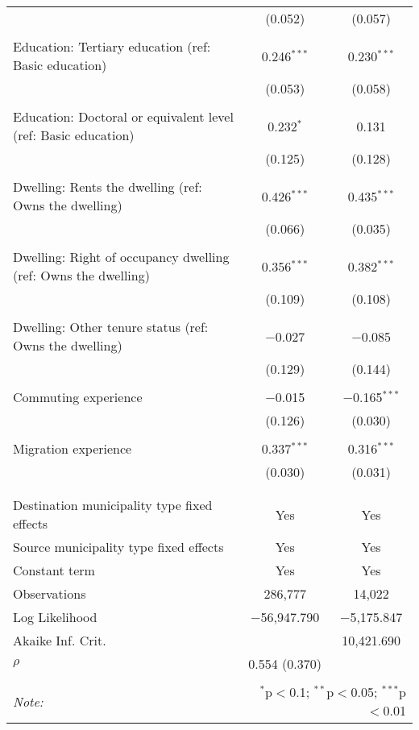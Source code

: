 \begin{table}[!htbp]
\begin{tabular}{@{\extracolsep{5pt}}lcc}
  & (0.052) & (0.057) \\ 
  & & \\ 
 Education: Tertiary education (ref: Basic education) & 0.246$^{***}$ & 0.230$^{***}$ \\ 
  & (0.053) & (0.058) \\ 
  & & \\ 
 Education: Doctoral or equivalent level (ref: Basic education) & 0.232$^{*}$ & 0.131 \\ 
  & (0.125) & (0.128) \\ 
  & & \\ 
 Dwelling: Rents the dwelling (ref: Owns the dwelling) & 0.426$^{***}$ & 0.435$^{***}$ \\ 
  & (0.066) & (0.035) \\ 
  & & \\ 
 Dwelling: Right of occupancy dwelling (ref: Owns the dwelling) & 0.356$^{***}$ & 0.382$^{***}$ \\ 
  & (0.109) & (0.108) \\ 
  & & \\ 
 Dwelling: Other tenure status (ref: Owns the dwelling) & $-$0.027 & $-$0.085 \\ 
  & (0.129) & (0.144) \\ 
  & & \\ 
 Commuting experience & $-$0.015 & $-$0.165$^{***}$ \\ 
  & (0.126) & (0.030) \\ 
  & & \\ 
 Migration experience & 0.337$^{***}$ & 0.316$^{***}$ \\ 
  & (0.030) & (0.031) \\ 
  & & \\ 
\hline \\[-1.8ex] 
Destination municipality type fixed effects & Yes & Yes \\ 
Source municipality type fixed effects & Yes & Yes \\ 
Constant term & Yes & Yes \\ 
Observations & 286,777 & 14,022 \\ 
Log Likelihood & $-$56,947.790 & $-$5,175.847 \\ 
Akaike Inf. Crit. &  & 10,421.690 \\ 
$\rho$ & 0.554  (0.370) &  \\ 
\hline 
\hline \\[-1.8ex] 
\textit{Note:}  & \multicolumn{2}{r}{$^{*}$p$<$0.1; $^{**}$p$<$0.05; $^{***}$p$<$0.01} \\ 
\end{tabular} 
\end{table} 
